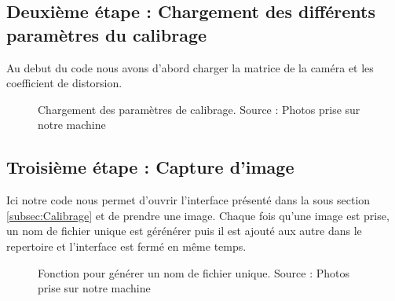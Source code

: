 \subsection{Deuxième étape : Chargement des différents paramètres du calibrage }
 
 Au debut du code nous avons d'abord charger la matrice de la caméra et les coefficient de distorsion.  
 
 \begin{figure}[H]%
 	\center%
 	\setlength{\fboxsep}{5pt}%
 	\setlength{\fboxrule}{0.5pt}%
 	\caption[Chargement des paramètres de calibrage]{Chargement des paramètres de calibrage. Source : Photos prise sur notre machine}
 	\label{fig:Chargement des paramètres de calibrage}
 \end{figure}
 
 
 \subsection{Troisième étape : Capture d'image}
 
 Ici notre code nous permet d'ouvrir l'interface présenté dans la sous section \ref{subsec:Calibrage} et de prendre une image. Chaque fois qu'une image est prise, un nom de fichier unique est gérénérer puis il est ajouté aux autre dans le repertoire et l'interface est fermé en même temps.
 
 \begin{figure}[H]%
 	\center%
 	\setlength{\fboxsep}{5pt}%
 	\setlength{\fboxrule}{0.5pt}%
 	\caption[Fonction pour générer un nom de fichier unique]{Fonction pour générer un nom de fichier unique. Source : Photos prise sur notre machine}
 	\label{fig:Fonction pour générer un nom de fichier unique}
 \end{figure}
 
